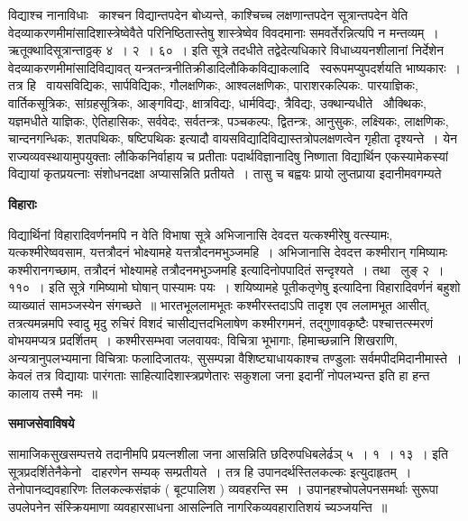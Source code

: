 \documentclass[11pt, openany]{book}
\begin{document}
विद्याश्च नानाविधाः \textendash\ काश्चन विद्यान्तपदेन बोध्यन्ते, काश्चिच्च लक्षणान्तपदेन सूत्रान्तपदेन वेति वेदव्याकरणमीमांसादिशास्त्रेष्वेवैते परिनिष्ठितास्तेषु शास्त्रेष्वेव विवदमानाः समवर्तेरन्नित्यपि न मन्तव्यम्~। ऋतूक्थादिसूत्रान्ताठ्ठक् ४~। २~। ६०~। इति सूत्रे तदधीते तद्वेदेत्यधिकारे विधाध्ययनशीलानां निर्देशेन वेदव्याकरणमीमांसादिविद्यावत् यन्त्रतन्त्रनीतिक्रीडादिलौकिकविद्याकलादि \textendash\ स्वरूपमप्युपदर्शयति भाष्यकारः~। तत्र हि \textendash\ {\qt वायसविद्यिकः, सार्पविद्यिकः, गौलक्षणिकः, आश्वलक्षणिकः, पाराशरकल्पिकः. पारयाज्ञिकः, वार्तिकसूत्रिकः, सांग्रहसूत्रिकः, आङ्गविद्यः, क्षात्रविद्यः, धार्मविद्यः, त्रैविद्यः, उक्थान्यधीते \textendash\ औक्थिकः, यज्ञमधीते याज्ञिकः, ऐतिहासिकः, सर्ववेदः, सर्वतन्त्रः, पञ्चकल्पः, द्वितन्त्रः, आनुसुकः, लक्ष्यिकः, लाक्षणिकः, चान्दनगन्धिकः, शतपथिकः, षष्टिपथिकः} इत्यादौ वायसविद्यादिविद्यास्तत्रोपलक्षणत्वेन गृहीता दृश्यन्ते~। येन राज्यव्यवस्थायामुपयुक्ताः लौकिकनिर्वाहाय च प्रतीताः पदार्थविज्ञानादिषु निष्णाता विद्यार्थिन एकस्यामेकस्यां विद्यायां कृतप्रयत्नाः संशोधनदक्षा अप्यासन्निति प्रतीयते~। तासु च बह्वयः प्रायो लुप्तप्राया इदानीमवगम्यते

\begin{center}
\textbf{\Large विहाराः \textendash\ }
\end{center}

विद्यार्थिनां विहारादिवर्णनमपि न वेति विभाषा सूत्रे अभिजानासि देवदत्त यत्कश्मीरेषु वत्स्यामः, यत्कश्मीरेष्ववसाम, यत्तत्रौदनं भोक्ष्यामहे यत्तत्रौदनमभुञ्जमहि~। अभिजानासि देवदत्त कश्मीरान् गमिष्यामः कश्मीरानगच्छाम, तत्रौदनं भोक्ष्यामहे तत्रौदनमभुञ्जमहि इत्यादिनोपपादितं सन्दृश्यते~। तथा \textendash\ लुङ् २~। ११०~। इति सूत्रे {\qt गमिष्यामो घोषान् पास्यामः पयः~। शयिष्यामहे पूतीकतृणेषु} इत्यादिना विहारादिवर्णनं बहुशो व्याख्यातं सामञ्जस्येन संगच्छते~॥ भारतभूललामभूतः कश्मीरस्तदाऽपि तादृश एव ललामभूत आसीत्, तत्रत्यमन्नमपि स्वादु मृदु रुचिरं विशदं चासीद्यत्तदभिलाषेण कश्मीरगमनं, तद्गुणावकृष्टैः पश्चात्तत्स्मरणं वोभयमप्यत्र प्रदर्शितम्~। कश्मीरसम्भवा जलवायवः, विचित्रा भूभागाः, हिमाच्छन्नानि शिखराणि, अन्यत्रानुपलभ्यमाना विचित्राः फलादिजातयः, सुसम्पन्ना वैशिष्ट्याधायकाश्च तण्डुलाः सर्वमपीदमिदानीमास्ते~। केवलं तत्र विद्यायाः पारंगताः साहित्यादिशास्त्रप्रणेतारः सकुशला जना इदानीं नोपलभ्यन्त इति हा हन्त कालाय तस्मै नमः~॥

\begin{center}
\textbf{\Large समाजसेवाविषये \textendash\ }
\end{center}

सामाजिकसुखसम्पत्तये तदानीमपि प्रयत्नशीला जना आसन्निति छदिरुपधिबलेर्ढञ् ५~। १~। १३~। इति सूत्रप्रदर्शितेनैकेनो \textendash\ दाहरणेन सम्यक् सम्प्रतीयते~। तत्र हि {\qt उपानदर्थस्तिलकल्कः} इत्युदाहृतम्~। तेनोपानव्द्यवहारिणः तिलकल्कसंज्ञकं ( बूटपालिश ) व्यवहरन्ति स्म~। उपानहश्चोपलेपनसमर्थाः सुरूपा उपलेपनेन संस्क्रियमाणा व्यवहारसाधना आसल्निति नागरिकव्यवहारातिशयं च्यञ्जयन्ति~॥ \\
\end{document}
